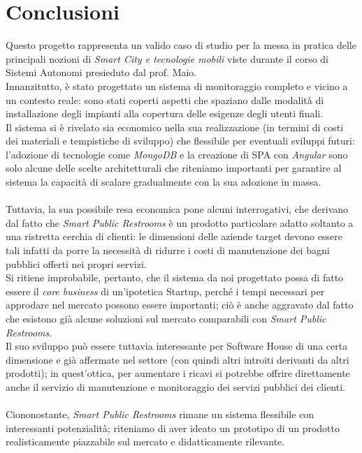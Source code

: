 \documentclass[12pt]{article}
\begin{document}
\section{Conclusioni}
Questo progetto rappresenta un valido caso di studio per la messa in pratica delle principali nozioni di \textit{Smart City e tecnologie mobili} viste durante il corso di Sistemi Autonomi presieduto dal prof. Maio.\\
Innanzitutto, è stato progettato un sistema di monitoraggio completo e vicino a un contesto reale: sono stati coperti aspetti che spaziano dalle modalità di installazione degli impianti alla copertura delle esigenze degli utenti finali.\\
Il sistema si è rivelato sia economico nella sua realizzazione (in termini di costi dei materiali e tempistiche di sviluppo) che flessibile per eventuali sviluppi futuri: l'adozione di tecnologie come \textit{MongoDB} e la creazione di SPA con \textit{Angular} sono solo alcune delle scelte architetturali che riteniamo importanti per garantire al sistema la capacità di scalare gradualmente con la sua adozione in massa.\\\\
Tuttavia, la sua possibile resa economica pone alcuni interrogativi, che derivano dal fatto che \textit{Smart Public Restrooms} è un prodotto particolare adatto soltanto a una ristretta cerchia di clienti: le dimensioni delle aziende target devono essere tali infatti da porre la necessità di ridurre i costi di manutenzione dei bagni pubblici offerti nei propri servizi.\\
Si ritiene improbabile, pertanto, che il sistema da noi progettato possa di fatto essere il \textit{core business} di un'ipotetica Startup, perché i tempi necessari per approdare nel mercato possono essere importanti; ciò è anche aggravato dal fatto che esistono già alcune soluzioni sul mercato comparabili con \textit{Smart Public Restrooms}.\\
Il suo sviluppo può essere tuttavia interessante per Software House di una certa dimensione e già affermate nel settore (con quindi altri introiti derivanti da altri prodotti); in quest'ottica, per aumentare i ricavi si potrebbe offrire direttamente anche il servizio di manutenzione e monitoraggio dei servizi pubblici dei clienti.\\\\
Ciononostante, \textit{Smart Public Restrooms} rimane un sistema flessibile con interessanti potenzialità; riteniamo di aver ideato un prototipo di un prodotto realisticamente piazzabile sul mercato e didatticamente rilevante.
\newpage
\end{document}
